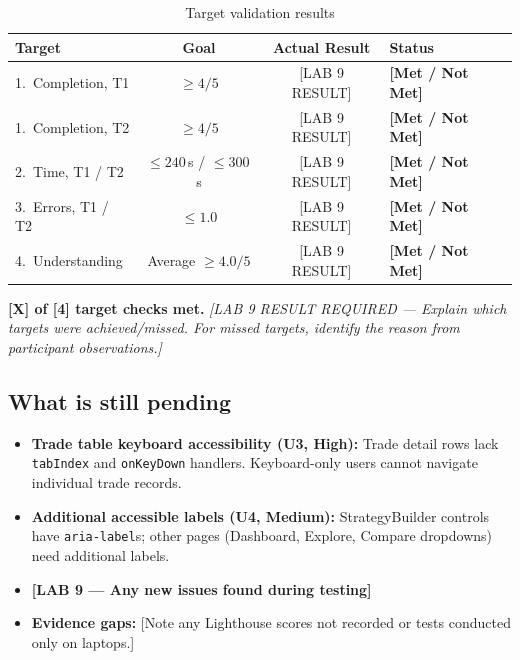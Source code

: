 \documentclass[10pt,a4paper]{article}
\begin{document}
\begin{table}[H]
\centering
\caption{Target validation results}
\label{tab:target-results}
\begin{tabularx}{\textwidth}{l c c l}
\toprule
\textbf{Target} & \textbf{Goal} & \textbf{Actual Result} & \textbf{Status} \\
\midrule
1.~Completion, T1 &
  $\geq 4/5$ &
  [LAB 9 RESULT] &
  \textbf{[Met / Not Met]} \\
1.~Completion, T2 &
  $\geq 4/5$ &
  [LAB 9 RESULT] &
  \textbf{[Met / Not Met]} \\
2.~Time, T1 / T2 &
  $\leq 240$\,s / $\leq 300$\,s &
  [LAB 9 RESULT] &
  \textbf{[Met / Not Met]} \\
3.~Errors, T1 / T2 &
  $\leq 1.0$ &
  [LAB 9 RESULT] &
  \textbf{[Met / Not Met]} \\
4.~Understanding &
  Average $\geq 4.0/5$ &
  [LAB 9 RESULT] &
  \textbf{[Met / Not Met]} \\
\bottomrule
\end{tabularx}
\end{table}

\textbf{[X] of [4] target checks met.}
\emph{[LAB 9 RESULT REQUIRED --- Explain which targets were achieved/missed. For missed targets, identify the reason from participant observations.]}

\subsection{What is still pending}

\begin{itemize}[nosep]
  \item \textbf{Trade table keyboard accessibility (U3, High):} Trade detail rows lack \texttt{tabIndex} and \texttt{onKeyDown} handlers. Keyboard-only users cannot navigate individual trade records.
  \item \textbf{Additional accessible labels (U4, Medium):} StrategyBuilder controls have \texttt{aria-label}s; other pages (Dashboard, Explore, Compare dropdowns) need additional labels.
  \item \textbf{[LAB 9 --- Any new issues found during testing]}
  \item \textbf{Evidence gaps:} [Note any Lighthouse scores not recorded or tests conducted only on laptops.]
\end{itemize}
\end{document}
